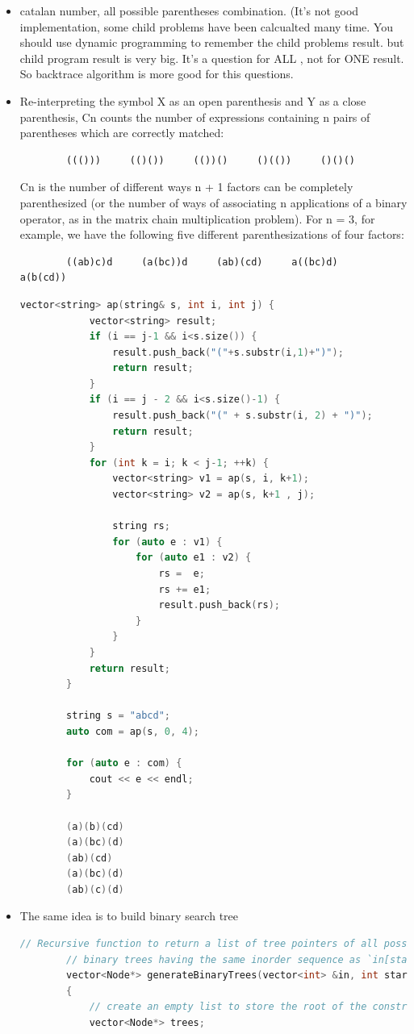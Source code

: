 \documentclass[a4paper,11pt,twoside]{book}
\begin{document}
\begin{itemize}
\begin{itemize}
	\item catalan number, all possible parentheses combination. (It's not good implementation, some child problems have been calcualted many time.  You should use dynamic programming to remember the child problems result. but child program result is very big.  It's a question for ALL , not for ONE result. So backtrace algorithm is more good for this questions. 
	
	\item Re-interpreting the symbol X as an open parenthesis and Y as a close parenthesis, Cn counts the number of expressions containing n pairs of parentheses which are correctly matched:
	\begin{lstlisting}
		((()))     (()())     (())()     ()(())     ()()()
	\end{lstlisting}
	
	Cn is the number of different ways n + 1 factors can be completely parenthesized (or the number of ways of associating n applications of a binary operator, as in the matrix chain multiplication problem). For n = 3, for example, we have the following five different parenthesizations of four factors:
	
	\begin{lstlisting}	
		((ab)c)d     (a(bc))d     (ab)(cd)     a((bc)d)     a(b(cd))
	\end{lstlisting}
	
	\begin{lstlisting}[frame=single, language=c++]
		vector<string> ap(string& s, int i, int j) {
			vector<string> result;
			if (i == j-1 && i<s.size()) {
				result.push_back("("+s.substr(i,1)+")");
				return result;
			}
			if (i == j - 2 && i<s.size()-1) {
				result.push_back("(" + s.substr(i, 2) + ")");
				return result;
			}	
			for (int k = i; k < j-1; ++k) {
				vector<string> v1 = ap(s, i, k+1);
				vector<string> v2 = ap(s, k+1 , j);
				
				string rs;
				for (auto e : v1) {
					for (auto e1 : v2) {
						rs =  e;
						rs += e1;
						result.push_back(rs);
					}
				}
			}
			return result;
		}
		
		string s = "abcd";
		auto com = ap(s, 0, 4);
		
		for (auto e : com) {
			cout << e << endl;
		}
		
		(a)(b)(cd)
		(a)(bc)(d)
		(ab)(cd)
		(a)(bc)(d)
		(ab)(c)(d)
	\end{lstlisting}
	
	\item The same idea is to build binary search tree
	\begin{lstlisting}[frame=single, language=c++]
		// Recursive function to return a list of tree pointers of all possible
		// binary trees having the same inorder sequence as `in[start, end]`
		vector<Node*> generateBinaryTrees(vector<int> &in, int start, int end)
		{
			// create an empty list to store the root of the constructed binary trees
			vector<Node*> trees;
			

\end{lstlisting}
\end{itemize}
\end{itemize}
\end{document}
